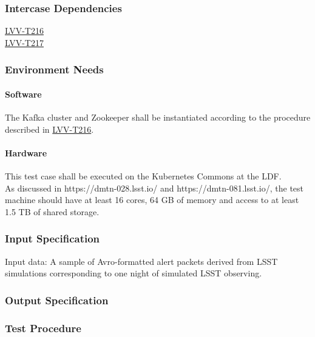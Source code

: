 \subsubsection{Intercase Dependencies}

​\href{https://jira.lsstcorp.org/secure/Tests.jspa\#/testCase/LVV-T216}{LVV-T216}​​​\\
​\href{https://jira.lsstcorp.org/secure/Tests.jspa\#/testCase/LVV-T217}{LVV-T217}​​​



\subsubsection{Environment Needs}

\paragraph{Software}

The Kafka cluster and Zookeeper shall be instantiated according to the
procedure described in
\href{https://jira.lsstcorp.org/secure/Tests.jspa\#/testCase/LVV-T216}{LVV-T216}.



\paragraph{Hardware}

This test case shall be executed on the Kubernetes Commons at the LDF.\\
As discussed in https://dmtn-028.lsst.io/ and https://dmtn-081.lsst.io/,
the test machine should have at least 16 cores, 64 GB of memory and
access to at least 1.5 TB of shared storage.



\subsubsection{Input Specification}

Input data: A sample of Avro-formatted alert packets derived from LSST
simulations corresponding to one night of simulated LSST observing.



\subsubsection{Output Specification}


\subsubsection{Test Procedure}

